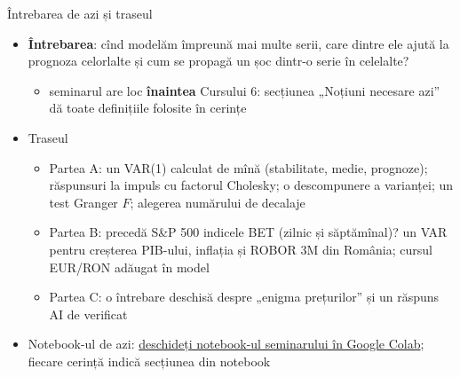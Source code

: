 \begin{frame}{Întrebarea de azi și traseul}
\itemsize{\small}
\begin{itemize}
    \item \textbf{Întrebarea}: cînd modelăm împreună mai multe serii, care dintre ele ajută la prognoza celorlalte și cum se propagă un șoc dintr-o serie în celelalte?
    \begin{itemize}
        \item seminarul are loc \textbf{înaintea} Cursului 6: secțiunea „Noțiuni necesare azi” dă toate definițiile folosite în cerințe
    \end{itemize}
    \item Traseul
    \begin{itemize}
        \item Partea A: un VAR(1) calculat de mînă (stabilitate, medie, prognoze); răspunsuri la impuls cu factorul Cholesky; o descompunere a varianței; un test Granger $F$; alegerea numărului de decalaje
        \item Partea B: precedă S\&P 500 indicele BET (zilnic și săptămînal)? un VAR pentru creșterea PIB-ului, inflația și ROBOR 3M din România; cursul EUR/RON adăugat în model
        \item Partea C: o întrebare deschisă despre „enigma prețurilor” și un răspuns AI de verificat
    \end{itemize}
    \item Notebook-ul de azi: \href{\nb}{deschideți notebook-ul seminarului în Google Colab}; fiecare cerință indică secțiunea din notebook
\end{itemize}
\end{frame}

